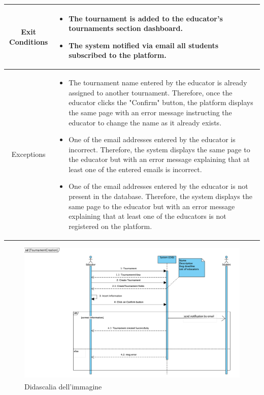 \begin{longtable}{|c| p{10cm}|}
                            \hline
            Exit Conditions &
            \begin{itemize}
                                    \item The tournament is added to the educator's tournaments section dashboard.
                                    \item The system notified via email all students subscribed to the platform.
                                \end{itemize}\\
        \hline
            Exceptions & \begin{itemize}
                \item The tournament name entered by the educator is already assigned to another tournament. Therefore, once the educator clicks the "Confirm" button, the platform displays the same page with an error message instructing the educator to change the name as it already exists.
                \item One of the email addresses entered by the educator is incorrect. Therefore, the system displays the same page to the educator but with an error message explaining that at least one of the entered emails is incorrect.
                \item One of the email addresses entered by the educator is not present in the database. Therefore, the system displays the same page to the educator but with an error message explaining that at least one of the educators is not registered on the platform.
            \end{itemize} \\
        \hline
    \end{longtable}

    \begin{figure}[H]
  \includegraphics[width=1\linewidth]{SequenceDiagram/TournamentCreation.png} 
  \caption{Didascalia dell'immagine}
  \label{fig:immagine}
\end{figure}
